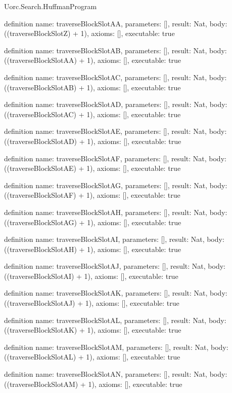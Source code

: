 \begin{lexlean}{Uorc.Search.HuffmanProgram}
\begin{semanticmodule}
definition{
  name: traverseBlockSlotAA,
  parameters: [],
  result: Nat,
  body: ((traverseBlockSlotZ) + 1),
  axioms: [],
  executable: true
}

definition{
  name: traverseBlockSlotAB,
  parameters: [],
  result: Nat,
  body: ((traverseBlockSlotAA) + 1),
  axioms: [],
  executable: true
}

definition{
  name: traverseBlockSlotAC,
  parameters: [],
  result: Nat,
  body: ((traverseBlockSlotAB) + 1),
  axioms: [],
  executable: true
}

definition{
  name: traverseBlockSlotAD,
  parameters: [],
  result: Nat,
  body: ((traverseBlockSlotAC) + 1),
  axioms: [],
  executable: true
}

definition{
  name: traverseBlockSlotAE,
  parameters: [],
  result: Nat,
  body: ((traverseBlockSlotAD) + 1),
  axioms: [],
  executable: true
}

definition{
  name: traverseBlockSlotAF,
  parameters: [],
  result: Nat,
  body: ((traverseBlockSlotAE) + 1),
  axioms: [],
  executable: true
}

definition{
  name: traverseBlockSlotAG,
  parameters: [],
  result: Nat,
  body: ((traverseBlockSlotAF) + 1),
  axioms: [],
  executable: true
}

definition{
  name: traverseBlockSlotAH,
  parameters: [],
  result: Nat,
  body: ((traverseBlockSlotAG) + 1),
  axioms: [],
  executable: true
}

definition{
  name: traverseBlockSlotAI,
  parameters: [],
  result: Nat,
  body: ((traverseBlockSlotAH) + 1),
  axioms: [],
  executable: true
}

definition{
  name: traverseBlockSlotAJ,
  parameters: [],
  result: Nat,
  body: ((traverseBlockSlotAI) + 1),
  axioms: [],
  executable: true
}

definition{
  name: traverseBlockSlotAK,
  parameters: [],
  result: Nat,
  body: ((traverseBlockSlotAJ) + 1),
  axioms: [],
  executable: true
}

definition{
  name: traverseBlockSlotAL,
  parameters: [],
  result: Nat,
  body: ((traverseBlockSlotAK) + 1),
  axioms: [],
  executable: true
}

definition{
  name: traverseBlockSlotAM,
  parameters: [],
  result: Nat,
  body: ((traverseBlockSlotAL) + 1),
  axioms: [],
  executable: true
}

definition{
  name: traverseBlockSlotAN,
  parameters: [],
  result: Nat,
  body: ((traverseBlockSlotAM) + 1),
  axioms: [],
  executable: true
}


\end{semanticmodule}
\end{lexlean}
